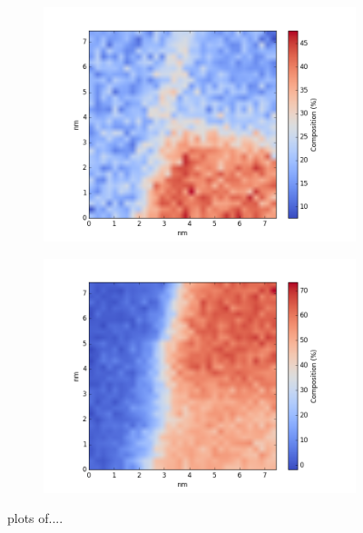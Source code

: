 \begin{figure}
\begin{subfigure}{0.45\textwidth}
		\includegraphics[width=\textwidth]{fig/q/E_heated/_binned_Ge_zetaAbs}
		\caption{}
		\label{fig:Ege}
	\end{subfigure}%
	\hfill
	\begin{subfigure}{0.45\textwidth}
		\includegraphics[width=\textwidth]{fig/q/E_heated/_binned_Pd_zetaAbs}
		\caption{}
		\label{fig:Epd}
	\end{subfigure}
	\caption{plots of....}
	\label{fig:E}
\end{figure}

